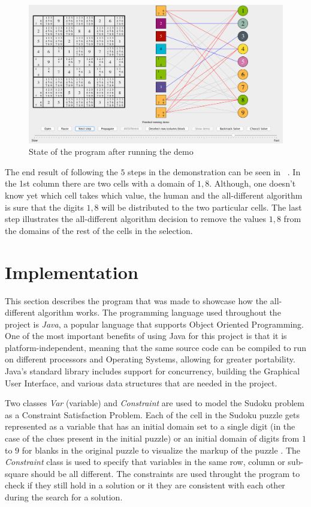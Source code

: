 \documentclass{l4proj}
\begin{document}

\begin{figure}[H]
\centering
\includegraphics[width=14cm]{images/proof_of_concept/screenshot7.png}
\caption{State of the program after running the demo}
\label{screenshot7}
\end{figure}

\noindent The end result of following the $5$ steps in the demonstration can be seen in ~. In the 1st column there are two cells with a domain of ${1, 8}$. Although, one doesn't know yet which cell takes which value, the human and the all-different algorithm is sure that the digits ${1, 8}$ will be distributed to the two particular cells. The last step illustrates the all-different algorithm decision to remove the values ${1, 8}$ from the domains of the rest of the cells in the selection.

\chapter{Implementation}
\label{chap6implementation}
\noindent This section describes the program that was made to showcase how the all-different algorithm works. The programming language used throughout the project is \textit{Java}, a popular language that supports Object Oriented Programming. One of the most important benefits of using Java for this project is that it is platform-independent, meaning that the same source code can be compiled to run on different processors and Operating Systems, allowing for greater portability. Java's standard library includes support for concurrency, building the Graphical User Interface, and various data structures that are needed in the project.

\noindent Two classes \textit{Var} (variable) and \textit{Constraint} are used to model the Sudoku problem as a Constraint Satisfaction Problem. Each of the cell in the Sudoku puzzle gets represented as a variable that has an initial domain set to a single digit (in the case of the clues present in the initial puzzle) or an initial domain of digits from $1$ to $9$ for blanks in the original puzzle to visualize the markup of the puzzle \cite{crook2009pencil}. The \textit{Constraint} class is used to specify that variables in the same row, column or sub-square should be all different. The constraints are used throught the program to check if they still hold in a solution or it they are consistent with each other during the search for a solution.
\end{document}
